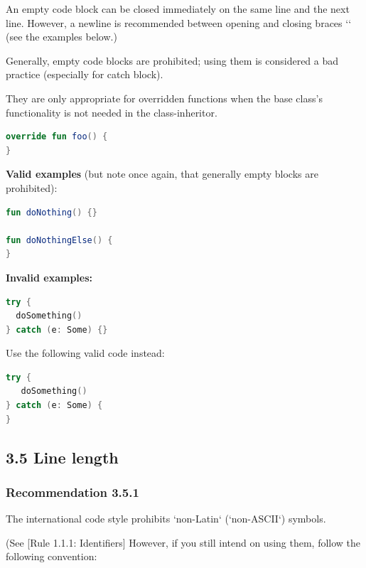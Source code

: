 An empty code block can be closed immediately on the same line and the next line. However, a newline is recommended between opening and closing braces `{}` (see the examples below.)



Generally, empty code blocks are prohibited; using them is considered a bad practice (especially for catch block).

They are only appropriate for overridden functions when the base class's functionality is not needed in the class-inheritor.

\begin{lstlisting}[language=Kotlin]
override fun foo() {
}
\end{lstlisting}


\textbf{Valid examples} (but note once again, that generally empty blocks are prohibited):



\begin{lstlisting}[language=Kotlin]
fun doNothing() {}

fun doNothingElse() {
}
\end{lstlisting}


\textbf{Invalid examples:}

\begin{lstlisting}[language=Kotlin]
try {
  doSomething()
} catch (e: Some) {}
\end{lstlisting}


Use the following valid code instead:

\begin{lstlisting}[language=Kotlin]
try {
   doSomething()
} catch (e: Some) {
}
\end{lstlisting}


\subsection*{\textbf{3.5 Line length}}

\subsubsection*{\textbf{Recommendation 3.5.1}}
\leavevmode\newline



The international code style prohibits `non-Latin` (`non-ASCII`) symbols.

(See [Rule 1.1.1: Identifiers] However, if you still intend on using them, follow the following convention:



